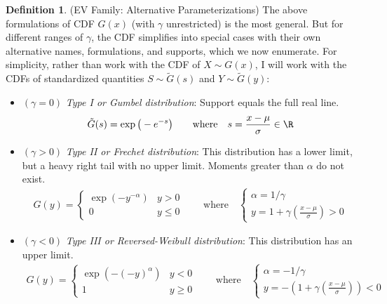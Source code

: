 \documentclass[12pt]{article}
\theoremstyle{plain}
\theoremstyle{definition}
\newtheorem{defn}[thm]{Definition}
\theoremstyle{remark}
\begin{document}
\begin{defn}(EV Family: Alternative Parameterizations)
The above formulations of CDF $G(x)$ (with $\gamma$ unrestricted) is the
most general. But for different ranges of $\gamma$, the CDF simplifies
into special cases with their own alternative names, formulations, and
supports, which we now enumerate.
For simplicity, rather than work with the CDF of $X\sim G(x)$, I will
work with the CDFs of standardized quantities $S\sim \tilde{G}(s)$ and
$Y\sim\tilde{G}(y)$:
\begin{itemize}
  \item
    $(\gamma=0)$
    \emph{Type I or Gumbel distribution}:
    Support equals the full real line.
    \begin{align*}
      \tilde{G}(s) = \exp\big(-e^{-s}\big)
      \qquad\text{where}\quad
      s=\frac{x-\mu}{\sigma} \in \R
    \end{align*}

  \item
    $(\gamma>0)$
    \emph{Type II or Frechet distribution}:
    This distribution has a lower limit, but a heavy right tail with no
    upper limit.  Moments greater than $\alpha$ do not exist.
    \begin{align*}
      G(y)
      =
      \begin{cases}
        \exp\left(
        -y^{-\alpha}
        \right)
        & y >0
        \\
        0 & y\leq 0
      \end{cases}
      \qquad\text{where}\quad
      \begin{cases}
        \alpha = 1/\gamma \\
        y = 1+\gamma \left(\frac{x-\mu}{\sigma}\right)>0
      \end{cases}
    \end{align*}

  \item
    $(\gamma<0)$
    \emph{Type III or Reversed-Weibull distribution}:
    This distribution has an upper limit.
    \begin{align*}
      G(y)
      =
      \begin{cases}
        \exp\left(
        -(-y)^{\alpha}
        \right)
        & y <0
        \\
        1 & y\geq 0
      \end{cases}
      \qquad\text{where}\quad
      \begin{cases}
        \alpha = -1/\gamma \\
        y = -\left(1+\gamma \left(\frac{x-\mu}{\sigma}\right)\right)<0
      \end{cases}
    \end{align*}
\end{itemize}
\end{defn}
\end{document}
